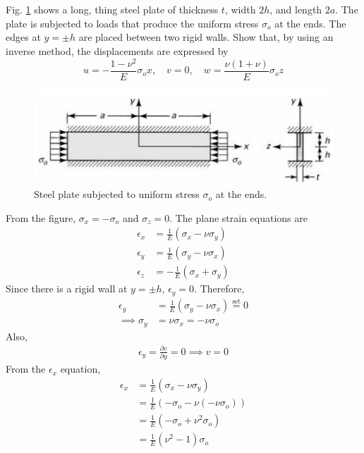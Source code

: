 \section{}
Fig. \ref{fig:Q1ProblemDiagram} shows a long, thing steel plate of thickness $t$, width $2h$, and length $2a$. The plate is
subjected to loads that produce the uniform stress $\sigma_o$ at the ends. The edges at $y=\pm h$ are placed between two 
rigid walls. Show that, by using an inverse method, the displacements are expressed by
\begin{equation*}
    u = - \frac{1-\nu^2}{E} \sigma_o x, \quad v = 0, \quad w = \frac{\nu (1+\nu)}{E} \sigma_o z
\end{equation*}

\begin{figure}[h]
    \centering
    \includegraphics[width=0.5\linewidth]{Questions/Figures/Q1ProblemDiagram.png}
    \caption{Steel plate subjected to uniform stress $\sigma_o$ at the ends.}
    \label{fig:Q1ProblemDiagram}
\end{figure}
From the figure, $\sigma_x = -\sigma_o$ and $\sigma_z = 0$. The plane strain equations are
\begin{align*}
    \epsilon_x &= \frac{1}{E} \left( \sigma_x - \nu \sigma_y \right) \\
    \epsilon_y &= \frac{1}{E} \left( \sigma_y - \nu \sigma_x \right) \\
    \epsilon_z &= -\frac{1}{E} \left( \sigma_x + \sigma_y \right)
\end{align*}
Since there is a rigid wall at $y=\pm h$, $\epsilon_y = 0$. Therefore,
\begin{align*}
    \epsilon_y &= \frac{1}{E} \left( \sigma_y - \nu \sigma_x \right) \overset{\text{set}}{=} 0 \\
    \implies \sigma_y &= \nu \sigma_x= -\nu \sigma_o
\end{align*}
Also,
\begin{align*}
    \epsilon_y = \frac{\partial v}{\partial y} = 0 \implies \boxed{v = 0}
\end{align*}
From the $\epsilon_x$ equation,
\begin{align*}
    \epsilon_x &= \frac{1}{E} \left( \sigma_x -\nu \sigma_y \right) \\
    &= \frac{1}{E} \left( -\sigma_o - \nu (-\nu \sigma_o) \right) \\
    &= \frac{1}{E} \left( -\sigma_o + \nu^2 \sigma_o \right) \\
    &= \frac{1}{E} \left( \nu^2 - 1 \right) \sigma_o
\end{align*}

